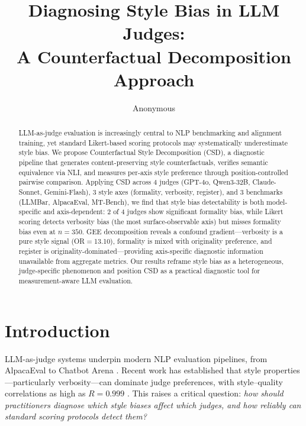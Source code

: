 \documentclass[11pt,a4paper]{article}
\title{Diagnosing Style Bias in LLM Judges:\\ A Counterfactual Decomposition Approach}
\author{Anonymous}
\date{}
\begin{document}
\maketitle

\begin{abstract}
LLM-as-judge evaluation is increasingly central to NLP benchmarking and alignment training, yet standard Likert-based scoring protocols may systematically underestimate style bias. We propose Counterfactual Style Decomposition (CSD), a diagnostic pipeline that generates content-preserving style counterfactuals, verifies semantic equivalence via NLI, and measures per-axis style preference through position-controlled pairwise comparison. Applying CSD across 4 judges (GPT-4o, Qwen3-32B, Claude-Sonnet, Gemini-Flash), 3 style axes (formality, verbosity, register), and 3 benchmarks (LLMBar, AlpacaEval, MT-Bench), we find that style bias detectability is both model-specific and axis-dependent: 2 of 4 judges show significant formality bias, while Likert scoring detects verbosity bias (the most surface-observable axis) but misses formality bias even at $n{=}350$. GEE decomposition reveals a confound gradient---verbosity is a pure style signal (OR$=$13.10), formality is mixed with originality preference, and register is originality-dominated---providing axis-specific diagnostic information unavailable from aggregate metrics. Our results reframe style bias as a heterogeneous, judge-specific phenomenon and position CSD as a practical diagnostic tool for measurement-aware LLM evaluation.
\end{abstract}

\section{Introduction}

LLM-as-judge systems underpin modern NLP evaluation pipelines, from AlpacaEval \citep{alpacaeval2024} to Chatbot Arena \citep{chiang2024chatbot}. Recent work has established that style properties---particularly verbosity---can dominate judge preferences, with style--quality correlations as high as $R{=}0.999$ \citep{sosbench2025}. This raises a critical question: \emph{how should practitioners diagnose which style biases affect which judges, and how reliably can standard scoring protocols detect them?}
\end{document}
